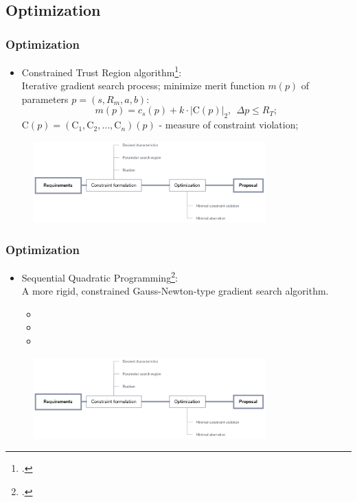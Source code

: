 \documentclass[10pt]{beamer}
\newcommand{\rfn}{\setcounter{footnote}{0}}
\begin{document}
\subsection{Optimization}
\begin{frame}
  \rfn
  \frametitle{Optimization}
  \begin{itemize}
    \item Constrained Trust Region algorithm\footcite{scipyctr}:\\
      Iterative gradient search process; minimize merit function $m(p)$ of parameters $p = (s, R_m, a, b)$:
      \[
      m(p) = c_s(p) + k \cdot |\text{C}(p)|_2,\ \ \Delta p \leq R_T;
      \]
      C$(p) = (\text{C}_1,\text{C}_2,...,\text{C}_n)(p)$ - measure of constraint violation;
  \end{itemize}

  \begin{figure}
    \includegraphics[width=0.8\textwidth]{blok_cxema}
  \end{figure}

\end{frame}

\begin{frame}
  \rfn
  \frametitle{Optimization}
  \begin{itemize}
    \item Sequential Quadratic Programming\footcite{sqp}:\\
    A more rigid, constrained Gauss-Newton-type gradient search algorithm.
    \begin{itemize}
      \item
      \item
      \item
    \end{itemize}
  \end{itemize}
  \begin{figure}
    \includegraphics[width=0.8\textwidth]{blok_cxema}
  \end{figure}

\end{frame}
\end{document}
